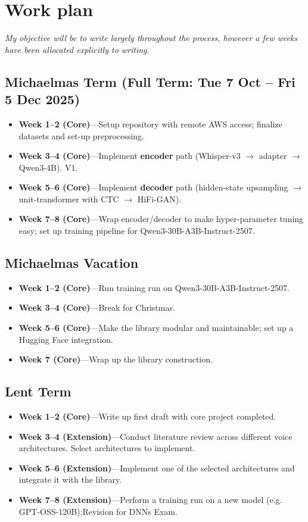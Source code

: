 \documentclass[11pt,a4paper]{scrartcl}
\begin{document}
\section{Work plan}

\emph{My objective will be to write largely throughout the process, however a few weeks have been allocated explicitly to writing.}

\subsection{Michaelmas Term (Full Term: Tue 7 Oct – Fri 5 Dec 2025)}
\begin{itemize}
  \item \textbf{Week 1–2 (Core)}—Setup repository with remote AWS access; finalize datasets and set-up preprocessing.
  \item \textbf{Week 3–4 (Core)}—Implement \textbf{encoder} path (Whisper-v3 $\to$ adapter $\to$ Qwen3-4B). V1.
  \item \textbf{Week 5–6 (Core)}—Implement \textbf{decoder} path (hidden-state upsampling $\to$ unit-transformer with CTC $\to$ HiFi-GAN).
  \item \textbf{Week 7–8 (Core)}—Wrap encoder/decoder to make hyper-parameter tuning easy; set up training pipeline for Qwen3-30B-A3B-Instruct-2507.
\end{itemize}

\subsection{Michaelmas Vacation}
\begin{itemize}
  \item \textbf{Week 1–2 (Core)}—Run training run on Qwen3-30B-A3B-Instruct-2507.
  \item \textbf{Week 3–4 (Core)}—Break for Christmas.
  \item \textbf{Week 5–6 (Core)}—Make the library modular and maintainable; set up a Hugging Face integration.
  \item \textbf{Week 7 (Core)}—Wrap up the library construction.
\end{itemize}

\subsection{Lent Term}
\begin{itemize}
  \item \textbf{Week 1–2 (Core)}—Write up first draft with core project completed.
  \item \textbf{Week 3–4 (Extension)}—Conduct literature review across different voice architectures. Select architectures to implement.
  \item \textbf{Week 5–6 (Extension)}—Implement one of the selected architectures and integrate it with the library. 
  \item \textbf{Week 7–8 (Extension)}—Perform a training run on a new model (e.g. GPT-OSS-120B);Revision for DNNs Exam.
\end{itemize}
\end{document}
